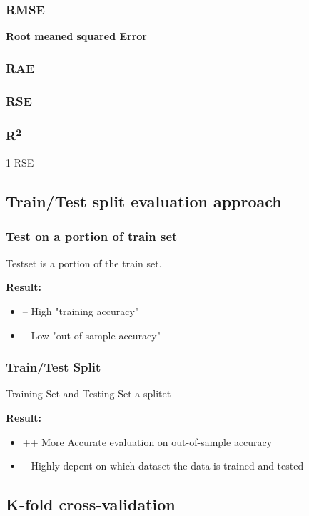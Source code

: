 \subsubsection{RMSE}
\textbf{Root meaned squared Error}

\subsubsection{RAE}

\subsubsection{RSE}

\subsubsection{R\textsuperscript{2}}
1-RSE
\subsection{Train/Test split evaluation approach}

\subsubsection{Test on a portion of train set}

Testset is a portion of the train set.

\textbf{Result:} 
\begin{itemize}
\item -- High "training accuracy"
\item -- Low "out-of-sample-accuracy"
\end{itemize}

\subsubsection{Train/Test Split}

Training Set and Testing Set a splitet


\textbf{Result:} 
\begin{itemize}
\item ++ More Accurate evaluation on out-of-sample accuracy
\item -- Highly depent on which dataset the data is trained and tested
\end{itemize}

\subsection{K-fold cross-validation}

